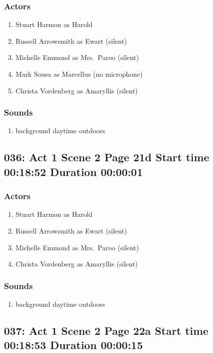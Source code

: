 \subsubsection{Actors}
\begin{enumerate}
\item Stuart Harmon as Harold
\item Russell Arrowsmith as Ewart (silent)
\item Michelle Emmond as Mrs.~Paroo (silent)
\item Mark Sousa as Marcellus (no microphone)
\item Christa Vordenberg as Amaryllis (silent)
\end{enumerate}

\subsubsection{Sounds}
\begin{enumerate}
\item background daytime outdoors
\end{enumerate}
\subsection{036: Act 1 Scene 2 Page 21d Start time 00:18:52 Duration 00:00:01}

\subsubsection{Actors}
\begin{enumerate}
\item Stuart Harmon as Harold
\item Russell Arrowsmith as Ewart (silent)
\item Michelle Emmond as Mrs.~Paroo (silent)
\item Christa Vordenberg as Amaryllis (silent)
\end{enumerate}

\subsubsection{Sounds}
\begin{enumerate}
\item background daytime outdoors
\end{enumerate}
\subsection{037: Act 1 Scene 2 Page 22a Start time 00:18:53 Duration 00:00:15}

